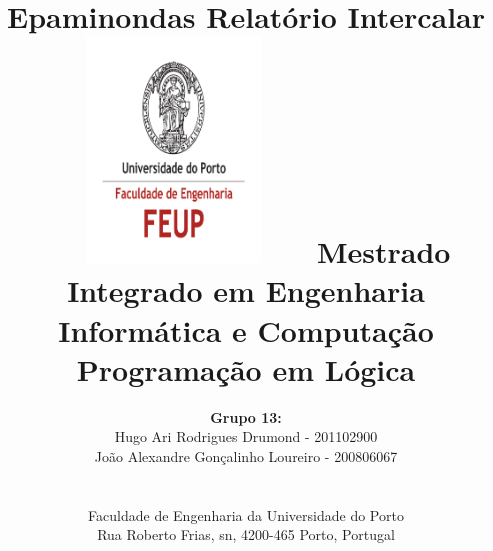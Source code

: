 \documentclass[a4paper]{article}
\begin{document}
\setlength{\textwidth}{16cm}
\setlength{\textheight}{22cm}

\title{\Huge\textbf{Epaminondas}\linebreak\linebreak\linebreak
\Large\textbf{Relatório Intercalar}\linebreak\linebreak
\includegraphics[height=6cm, width=7cm]{feup.pdf}\linebreak \linebreak
\Large{Mestrado Integrado em Engenharia Informática e Computação} \linebreak \linebreak
\Large{Programação em Lógica}\linebreak
}

\author{\textbf{Grupo 13:}\\ Hugo Ari Rodrigues Drumond - 201102900 \\ João Alexandre Gonçalinho Loureiro - 200806067 \\\linebreak\linebreak \\
 \\ Faculdade de Engenharia da Universidade do Porto \\ Rua Roberto Frias, s\/n, 4200-465 Porto, Portugal \linebreak\linebreak\linebreak
\linebreak\linebreak\vspace{1cm}}
\maketitle
\thispagestyle{empty}

\end{document}
